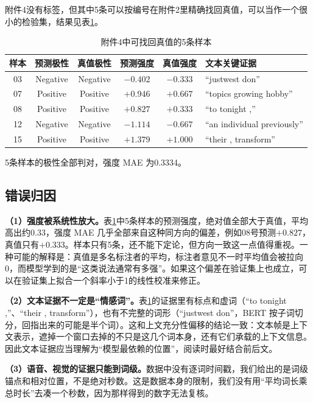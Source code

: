 附件4没有标签，但其中5条可以按编号在附件2里精确找回真值，可以当作一个很小的检验集，结果见表\ref{tab:att4match}。

\begin{table}[htbp]
\centering
\caption{附件4中可找回真值的5条样本}
\label{tab:att4match}
\begin{tabular}{cccccl}
\toprule
样本 & 预测极性 & 真值极性 & 预测强度 & 真值强度 & 文本关键证据 \\
\midrule
03 & Negative & Negative & $-0.402$ & $-0.333$ & “justwest don” \\
07 & Positive & Positive & $+0.946$ & $+0.667$ & “topics growing hobby” \\
08 & Positive & Positive & $+0.827$ & $+0.333$ & “to tonight ,” \\
12 & Negative & Negative & $-1.114$ & $-0.667$ & “an individual previously” \\
15 & Positive & Positive & $+1.379$ & $+1.000$ & “their , transform” \\
\bottomrule
\end{tabular}
\end{table}

5条样本的极性全部判对，强度 MAE 为0.3334。

\subsection{错误归因}\label{sec:q3err}

\textbf{（1）强度被系统性放大。}表\ref{tab:att4match}中5条样本的预测强度，绝对值全部大于真值，平均高出约0.33，强度 MAE 几乎全部来自这种同方向的偏差，例如08号预测$+0.827$，真值只有$+0.333$。样本只有5条，还不能下定论，但方向一致这一点值得重视。一种可能的解释是：真值是多名标注者的平均，标注者意见不一时平均值会被拉向0，而模型学到的是“这类说法通常有多强”。如果这个偏差在验证集上也成立，可以在验证集上拟合一个斜率小于1的线性校准来修正。

\textbf{（2）文本证据不一定是“情感词”。}表\ref{tab:att4match}的证据里有标点和虚词（“to tonight ,”、“their , transform”），也有不完整的词形（“justwest don”，BERT 按子词切分，回指出来的可能是半个词）。这和上文充分性偏移的结论一致：文本帧是上下文表示，遮掉一个窗口去掉的不只是这几个词本身，还有它们承载的上下文信息。因此文本证据应当理解为“模型最依赖的位置”，阅读时最好结合前后文。

\textbf{（3）语音、视觉的证据只能到词级。}数据中没有逐词时间戳，我们给出的是词级锚点和相对位置，不是绝对秒数。这是数据本身的限制，我们没有用“平均词长乘总时长”去凑一个秒数，因为那样得到的数字无法复核。

